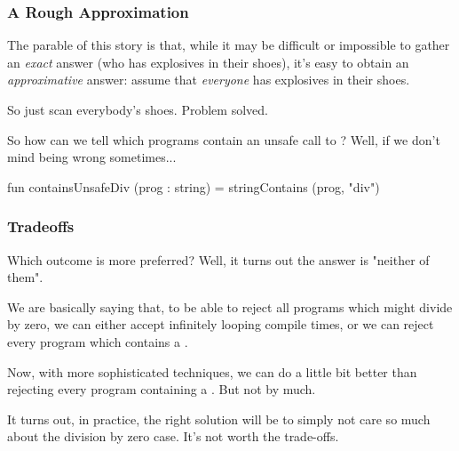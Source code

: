 \documentclass[aspectratio=169, handout]{beamer}
\begin{document}
\begin{frame}[fragile]
  \frametitle{A Rough Approximation}

  The parable of this story is that, while it may be difficult or impossible to
  gather an \textit{exact} answer (who has explosives in their shoes), it's easy
  to obtain an \textit{approximative} answer: assume that \textit{everyone} has
  explosives in their shoes.

  \pause
  \vspace{\fill}

  So just scan everybody's shoes. Problem solved.

  \pause
  \vspace{\fill}

  So how can we tell which programs contain an unsafe call to ? Well,
  if we don't mind being wrong sometimes...

  \pause
  \vspace{\fill}

  \begin{codeblock}
    fun containsUnsafeDiv (prog : string) =
      stringContains (prog, "div")
  \end{codeblock}
\end{frame}

\begin{frame}[fragile]
  \frametitle{Tradeoffs}

  Which outcome is more preferred? Well, it turns out the answer is
  "neither of them".

  \pause
  \vspace{\fill}

  We are basically saying that, to be able to reject all programs which
  might divide by zero, we can either accept infinitely looping
  compile times, or we can reject every program which contains a .

  \pause
  \vspace{\fill}

  Now, with more sophisticated techniques, we can do a little bit better
  than rejecting every program containing a . But not by much.

  \pause
  \vspace{\fill}

  It turns out, in practice, the right solution will be to simply not
  care so much about the division by zero case. It's not worth the
  trade-offs.
\end{frame}
\end{document}
